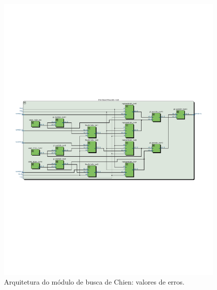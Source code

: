 \begin{figure}[!htb]
	\caption{\label{fig_chienval_arq}Arquitetura do módulo de busca de Chien: valores de erros.}
	\centering %
	\includegraphics[width=1\textwidth,  trim = {2cm 7cm 2cm 7cm}]{RS/ChienValueRTL.pdf}
	\legend{}
\end{figure}
